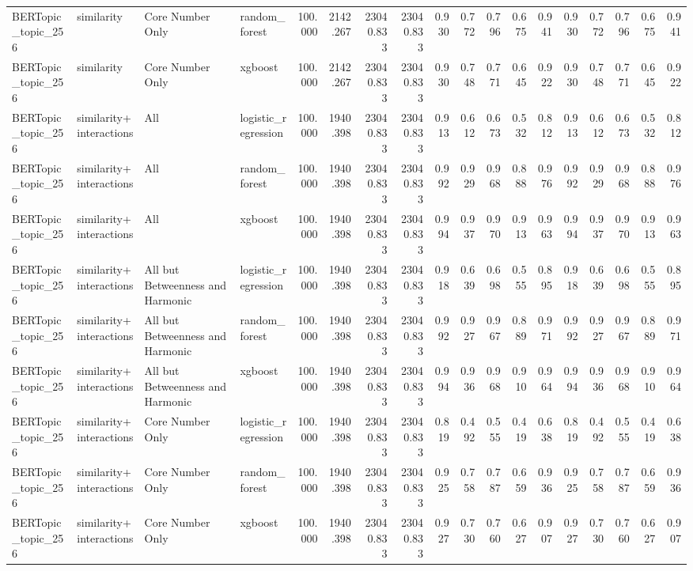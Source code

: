 \begin{tabular}{llllrrrrrrrrrrrrrr}
BERTopic_topic_256 & similarity & Core Number Only & random_forest & 100.000 & 2142.267 & 23040.833 & 23040.833 & 0.930 & 0.772 & 0.796 & 0.675 & 0.941 & 0.930 & 0.772 & 0.796 & 0.675 & 0.941 \\
BERTopic_topic_256 & similarity & Core Number Only & xgboost & 100.000 & 2142.267 & 23040.833 & 23040.833 & 0.930 & 0.748 & 0.771 & 0.645 & 0.922 & 0.930 & 0.748 & 0.771 & 0.645 & 0.922 \\
BERTopic_topic_256 & similarity+interactions & All & logistic_regression & 100.000 & 1940.398 & 23040.833 & 23040.833 & 0.913 & 0.612 & 0.673 & 0.532 & 0.812 & 0.913 & 0.612 & 0.673 & 0.532 & 0.812 \\
BERTopic_topic_256 & similarity+interactions & All & random_forest & 100.000 & 1940.398 & 23040.833 & 23040.833 & 0.992 & 0.929 & 0.968 & 0.888 & 0.976 & 0.992 & 0.929 & 0.968 & 0.888 & 0.976 \\
BERTopic_topic_256 & similarity+interactions & All & xgboost & 100.000 & 1940.398 & 23040.833 & 23040.833 & 0.994 & 0.937 & 0.970 & 0.913 & 0.963 & 0.994 & 0.937 & 0.970 & 0.913 & 0.963 \\
BERTopic_topic_256 & similarity+interactions & All but Betweenness and Harmonic & logistic_regression & 100.000 & 1940.398 & 23040.833 & 23040.833 & 0.918 & 0.639 & 0.698 & 0.555 & 0.895 & 0.918 & 0.639 & 0.698 & 0.555 & 0.895 \\
BERTopic_topic_256 & similarity+interactions & All but Betweenness and Harmonic & random_forest & 100.000 & 1940.398 & 23040.833 & 23040.833 & 0.992 & 0.927 & 0.967 & 0.889 & 0.971 & 0.992 & 0.927 & 0.967 & 0.889 & 0.971 \\
BERTopic_topic_256 & similarity+interactions & All but Betweenness and Harmonic & xgboost & 100.000 & 1940.398 & 23040.833 & 23040.833 & 0.994 & 0.936 & 0.968 & 0.910 & 0.964 & 0.994 & 0.936 & 0.968 & 0.910 & 0.964 \\
BERTopic_topic_256 & similarity+interactions & Core Number Only & logistic_regression & 100.000 & 1940.398 & 23040.833 & 23040.833 & 0.819 & 0.492 & 0.555 & 0.419 & 0.638 & 0.819 & 0.492 & 0.555 & 0.419 & 0.638 \\
BERTopic_topic_256 & similarity+interactions & Core Number Only & random_forest & 100.000 & 1940.398 & 23040.833 & 23040.833 & 0.925 & 0.758 & 0.787 & 0.659 & 0.936 & 0.925 & 0.758 & 0.787 & 0.659 & 0.936 \\
BERTopic_topic_256 & similarity+interactions & Core Number Only & xgboost & 100.000 & 1940.398 & 23040.833 & 23040.833 & 0.927 & 0.730 & 0.760 & 0.627 & 0.907 & 0.927 & 0.730 & 0.760 & 0.627 & 0.907 \\

\end{tabular}
